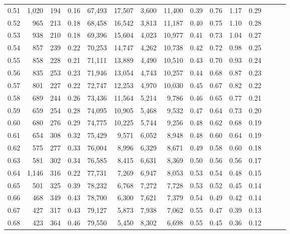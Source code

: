 \begin{tabular}{rrrrrrrrrrrrrrr}
0.51 &  1,020 &  194 &  0.16 &  67,493 &  17,507 &   3,600 &  11,400 &  0.39 &  0.76 &  1.17 &      0.29 \\
0.52 &    965 &  213 &  0.18 &  68,458 &  16,542 &   3,813 &  11,187 &  0.40 &  0.75 &  1.10 &      0.28 \\
0.53 &    938 &  210 &  0.18 &  69,396 &  15,604 &   4,023 &  10,977 &  0.41 &  0.73 &  1.04 &      0.27 \\
0.54 &    857 &  239 &  0.22 &  70,253 &  14,747 &   4,262 &  10,738 &  0.42 &  0.72 &  0.98 &      0.25 \\
0.55 &    858 &  228 &  0.21 &  71,111 &  13,889 &   4,490 &  10,510 &  0.43 &  0.70 &  0.93 &      0.24 \\
0.56 &    835 &  253 &  0.23 &  71,946 &  13,054 &   4,743 &  10,257 &  0.44 &  0.68 &  0.87 &      0.23 \\
0.57 &    801 &  227 &  0.22 &  72,747 &  12,253 &   4,970 &  10,030 &  0.45 &  0.67 &  0.82 &      0.22 \\
0.58 &    689 &  244 &  0.26 &  73,436 &  11,564 &   5,214 &   9,786 &  0.46 &  0.65 &  0.77 &      0.21 \\
0.59 &    659 &  254 &  0.28 &  74,095 &  10,905 &   5,468 &   9,532 &  0.47 &  0.64 &  0.73 &      0.20 \\
0.60 &    680 &  276 &  0.29 &  74,775 &  10,225 &   5,744 &   9,256 &  0.48 &  0.62 &  0.68 &      0.19 \\
0.61 &    654 &  308 &  0.32 &  75,429 &   9,571 &   6,052 &   8,948 &  0.48 &  0.60 &  0.64 &      0.19 \\
0.62 &    575 &  277 &  0.33 &  76,004 &   8,996 &   6,329 &   8,671 &  0.49 &  0.58 &  0.60 &      0.18 \\
0.63 &    581 &  302 &  0.34 &  76,585 &   8,415 &   6,631 &   8,369 &  0.50 &  0.56 &  0.56 &      0.17 \\
0.64 &  1,146 &  316 &  0.22 &  77,731 &   7,269 &   6,947 &   8,053 &  0.53 &  0.54 &  0.48 &      0.15 \\
0.65 &    501 &  325 &  0.39 &  78,232 &   6,768 &   7,272 &   7,728 &  0.53 &  0.52 &  0.45 &      0.14 \\
0.66 &    468 &  349 &  0.43 &  78,700 &   6,300 &   7,621 &   7,379 &  0.54 &  0.49 &  0.42 &      0.14 \\
0.67 &    427 &  317 &  0.43 &  79,127 &   5,873 &   7,938 &   7,062 &  0.55 &  0.47 &  0.39 &      0.13 \\
0.68 &    423 &  364 &  0.46 &  79,550 &   5,450 &   8,302 &   6,698 &  0.55 &  0.45 &  0.36 &      0.12 \\

\end{tabular}
